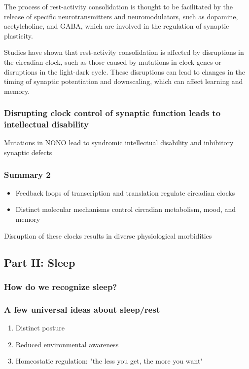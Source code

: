 \begin{itemize}
\begin{itemize}
The process of rest-activity consolidation is thought to be facilitated by the release of specific neurotransmitters and neuromodulators, such as dopamine, acetylcholine, and GABA, which are involved in the regulation of synaptic plasticity.

Studies have shown that rest-activity consolidation is affected by disruptions in the circadian clock, such as those caused by mutations in clock genes or disruptions in the light-dark cycle. These disruptions can lead to changes in the timing of synaptic potentiation and downscaling, which can affect learning and memory.


\subsubsection{Disrupting clock control of synaptic function leads to intellectual disability}
Mutations in NONO lead to syndromic intellectual disability and inhibitory synaptic defects

\subsubsection{Summary 2}
\begin{itemize}
    \item Feedback loops of transcription and
translation regulate circadian clocks
\item Distinct molecular mechanisms control
circadian metabolism, mood, and memory

\end{itemize}
Disruption of these clocks results in diverse
physiological morbidities 

\subsection{Part II: Sleep}
\subsubsection{How do we recognize sleep?}
\subsubsection{A few universal ideas about sleep/rest}
\begin{enumerate}
    \item Distinct posture
\item Reduced environmental awareness
\item Homeostatic regulation: "the less you get, the more you want"
\end{enumerate}


\end{itemize}
\end{itemize}
